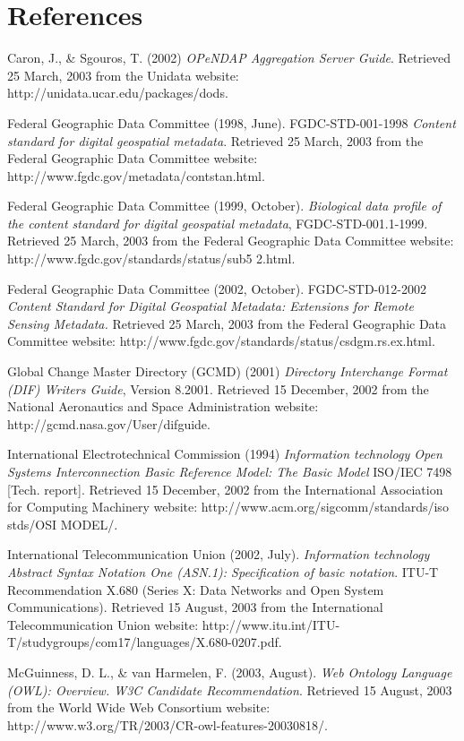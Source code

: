 \documentclass{codata}
\begin{document}
\raggedright
%
%

\section{References}

Caron, J., \& Sgouros, T. (2002) \emph{OPeNDAP Aggregation Server
Guide}. Retrieved 25 March, 2003 from the Unidata website:
http://unidata.ucar.edu/packages/dods. 

Federal Geographic Data Committee (1998, June). FGDC-STD-001-1998
\emph{Content standard for digital geospatial metadata}. Retrieved 25 March,
2003 from the Federal Geographic Data Committee website:
http://www.fgdc.gov/metadata/contstan.html. 

Federal Geographic Data Committee (1999, October). \emph{Biological data
profile of the content standard for digital geospatial metadata},
FGDC-STD-001.1-1999. Retrieved 25 March, 2003 from the Federal
Geographic Data Committee website:
http://www.fgdc.gov/standards/status/sub5 2.html. 

Federal Geographic Data Committee (2002, October). FGDC-STD-012-2002
\emph{Content Standard for Digital Geospatial Metadata: Extensions for
Remote Sensing Metadata.} Retrieved 25 March, 2003 from the Federal
Geographic Data Committee website:
http://www.fgdc.gov/standards/status/csdgm.rs.ex.html. 

Global Change Master Directory (GCMD) (2001) \emph{Directory Interchange
Format (DIF) Writers Guide}, Version 8.2001. Retrieved 15 December,
2002 from the National Aeronautics and Space Administration website:
http://gcmd.nasa.gov/User/difguide. 

International Electrotechnical Commission (1994) \emph{Information
technology  Open Systems Interconnection  Basic Reference Model: The
Basic Model}  ISO/IEC 7498 [Tech. report]. Retrieved 15 December, 2002
from the International Association for Computing Machinery website:
http://www.acm.org/sigcomm/standards/iso stds/OSI MODEL/. 

International Telecommunication Union (2002, July). \emph{Information
technology  Abstract Syntax Notation One (ASN.1): Specification of
basic notation}. ITU-T Recommendation X.680 (Series X: Data Networks
and Open System Communications). Retrieved 15 August, 2003 from the
International Telecommunication Union website:
http://www.itu.int/ITU-T/studygroups/com17/languages/X.680-0207.pdf. 

McGuinness, D. L., \& van Harmelen, F. (2003, August). \emph{Web Ontology
Language (OWL): Overview. W3C Candidate Recommendation}. Retrieved 15
August, 2003 from the World Wide Web Consortium website:
http://www.w3.org/TR/2003/CR-owl-features-20030818/. 
\end{document}
